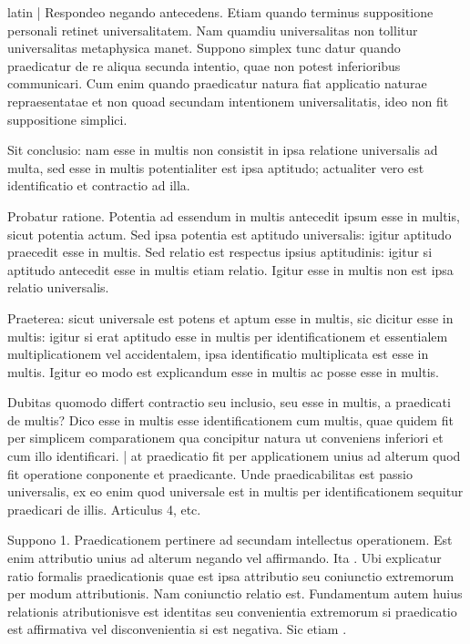 \begin{otherlanguage*}{latin}
\pstart
  \textnormal{|}   Respondeo negando antecedens. Etiam quando terminus suppositione personali retinet universalitatem. Nam quamdiu universalitas non tollitur universalitas metaphysica manet. Suppono simplex tunc datur quando praedicatur de re aliqua secunda intentio, quae non potest inferioribus communicari. Cum enim quando praedicatur natura fiat applicatio naturae repraesentatae et non quoad secundam intentionem universalitatis, ideo non fit suppositione simplici. 
\pend

\pstart
  Sit conclusio: nam esse in multis non consistit in ipsa relatione universalis ad multa, sed esse in multis potentialiter est ipsa aptitudo; actualiter vero est identificatio et contractio ad illa. 
\pend

\pstart
  Probatur ratione. Potentia ad essendum in multis antecedit ipsum esse in multis, sicut potentia actum. Sed ipsa potentia est aptitudo universalis: igitur aptitudo praecedit esse in multis. Sed relatio est respectus ipsius aptitudinis: igitur si aptitudo antecedit esse in multis etiam relatio. Igitur esse in multis non est ipsa relatio universalis. 
\pend

\pstart
  Praeterea: sicut universale est potens et aptum esse in multis, sic dicitur esse in multis: igitur si erat aptitudo esse in multis per  identificationem et essentialem multiplicationem vel accidentalem, ipsa identificatio multiplicata est esse in multis. Igitur eo modo est explicandum esse in multis ac posse esse in multis. 
\pend

\pstart
  Dubitas quomodo differt contractio seu inclusio, seu esse in multis, a praedicati de multis? Dico esse in multis esse identificationem cum multis, quae quidem fit per simplicem comparationem qua concipitur natura ut conveniens inferiori et cum illo identificari. \textnormal{|} at praedicatio fit per applicationem unius ad alterum quod fit operatione conponente et praedicante. Unde praedicabilitas est passio universalis, ex eo enim quod universale est in multis per identificationem sequitur praedicari de illis. Articulus 4, etc. 
\pend

        \pstart
        \pend
      
\pstart
  Suppono 1. Praedicationem pertinere ad secundam intellectus operationem. Est enim attributio unius ad alterum negando vel affirmando. Ita . Ubi explicatur ratio formalis praedicationis quae est ipsa attributio seu coniunctio extremorum per modum attributionis. Nam coniunctio relatio est. Fundamentum autem huius relationis atributionisve est identitas seu convenientia extremorum si praedicatio est affirmativa vel disconvenientia si est negativa. Sic etiam . 
\pend


\end{otherlanguage*}
